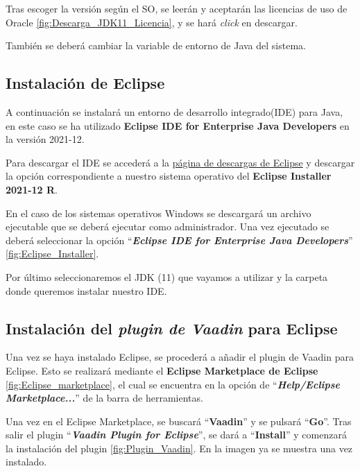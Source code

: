 Tras escoger la versión según el SO, se leerán y aceptarán las licencias de uso de Oracle \ref{fig:Descarga_JDK11_Licencia}, y se hará \emph{click} en descargar.


También se deberá cambiar la variable de entorno de Java del sistema.



\subsection{Instalación de Eclipse}
A continuación se instalará un entorno de desarrollo integrado(IDE) para Java, en este caso se ha utilizado \textbf{Eclipse IDE for Enterprise Java Developers} en la versión 2021-12. 

Para descargar el IDE se accederá a la \href{https://www.eclipse.org/downloads/packages/release/2021-12/r}{página de descargas de Eclipse} y descargar la opción correspondiente a nuestro sistema operativo del \textbf{Eclipse Installer 2021-12 R}. 

En el caso de los sistemas operativos Windows se descargará un archivo ejecutable que se deberá ejecutar como administrador. Una vez ejecutado se deberá seleccionar la opción ``\textbf{\textit{Eclipse IDE for Enterprise Java Developers}}'' \ref{fig:Eclipse_Installer}. 


Por último seleccionaremos el JDK (11) que vayamos a utilizar y la carpeta donde queremos instalar nuestro IDE.

\subsection{Instalación del \textit{plugin de Vaadin} para Eclipse}
Una vez se haya instalado Eclipse, se procederá a añadir el plugin de Vaadin para Eclipse. Esto se realizará mediante el \textbf{Eclipse Marketplace de Eclipse} \ref{fig:Eclipse_marketplace}, el cual se encuentra en la opción de ``\textbf{\textit{Help/Eclipse Marketplace...}}'' de la barra de herramientas.


Una vez en el Eclipse Marketplace, se buscará ``\textbf{Vaadin}'' y se pulsará ``\textbf{Go}''. Tras salir el plugin ``\textbf{\textit{Vaadin Plugin for Eclipse}}'', se dará a ``\textbf{Install}'' y comenzará la instalación del plugin \ref{fig:Plugin_Vaadin}. En la imagen ya se muestra una vez instalado.

